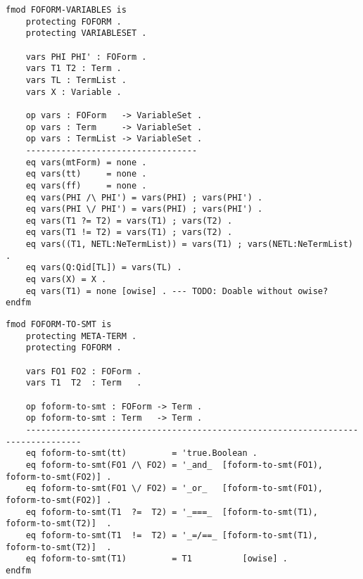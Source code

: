 \documentclass[]{article}
\begin{document}
\begin{verbatim}
fmod FOFORM-VARIABLES is
    protecting FOFORM .
    protecting VARIABLESET .

    vars PHI PHI' : FOForm .
    vars T1 T2 : Term .
    vars TL : TermList .
    vars X : Variable .

    op vars : FOForm   -> VariableSet .
    op vars : Term     -> VariableSet .
    op vars : TermList -> VariableSet .
    ----------------------------------
    eq vars(mtForm) = none .
    eq vars(tt)     = none .
    eq vars(ff)     = none .
    eq vars(PHI /\ PHI') = vars(PHI) ; vars(PHI') .
    eq vars(PHI \/ PHI') = vars(PHI) ; vars(PHI') .
    eq vars(T1 ?= T2) = vars(T1) ; vars(T2) .
    eq vars(T1 != T2) = vars(T1) ; vars(T2) .
    eq vars((T1, NETL:NeTermList)) = vars(T1) ; vars(NETL:NeTermList) .
    eq vars(Q:Qid[TL]) = vars(TL) .
    eq vars(X) = X .
    eq vars(T1) = none [owise] . --- TODO: Doable without owise?
endfm
\end{verbatim}

\begin{verbatim}
fmod FOFORM-TO-SMT is
    protecting META-TERM .
    protecting FOFORM .

    vars FO1 FO2 : FOForm .
    vars T1  T2  : Term   .

    op foform-to-smt : FOForm -> Term .
    op foform-to-smt : Term   -> Term .
    ---------------------------------------------------------------------------------
    eq foform-to-smt(tt)         = 'true.Boolean .
    eq foform-to-smt(FO1 /\ FO2) = '_and_  [foform-to-smt(FO1), foform-to-smt(FO2)] .
    eq foform-to-smt(FO1 \/ FO2) = '_or_   [foform-to-smt(FO1), foform-to-smt(FO2)] .
    eq foform-to-smt(T1  ?=  T2) = '_===_  [foform-to-smt(T1),  foform-to-smt(T2)]  .
    eq foform-to-smt(T1  !=  T2) = '_=/==_ [foform-to-smt(T1),  foform-to-smt(T2)]  .
    eq foform-to-smt(T1)         = T1          [owise] .
endfm
\end{verbatim}
\end{document}
